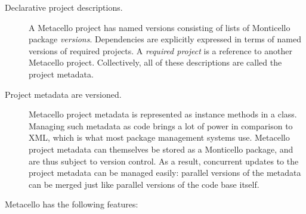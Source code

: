 \documentclass[a4paper,10pt,twoside]{book}
\begin{document}
\begin{description}
\item[Declarative project descriptions.] A Metacello project has named versions consisting of lists of Monticello package \emph{versions}. Dependencies are explicitly expressed in terms of named versions of required projects. A \emph{required project} is a reference to another Metacello project.  Collectively, all of these descriptions are called the project metadata.

\item[Project metadata are versioned.] Metacello project metadata is represented as instance methods in a class. Managing such metadata as code brings a lot of power in comparison to XML, which is what most package management systems use. Metacello project metadata can themselves be stored as a Monticello package, and are thus subject to version control.
As a result,
concurrent updates to the project metadata can be managed easily: parallel versions of the metadata can be merged just like parallel versions of the code base itself.



\end{description}

Metacello has the following features:
\end{document}
